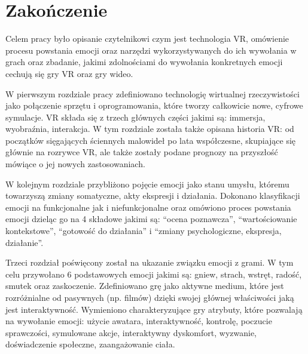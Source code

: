 \chapter*{Zakończenie}
\label{chap:zakonczenie}


Celem pracy było opisanie czytelnikowi czym jest technologia VR,
omówienie procesu powstania emocji oraz narzędzi wykorzystywanych do ich wywołania w
grach oraz zbadanie, jakimi zdolnościami do wywołania konkretnych emocji cechują się gry VR oraz gry wideo.
    
W pierwszym rozdziale pracy zdefiniowano technologię wirtualnej rzeczywistości jako połączenie sprzętu i oprogramowania, które tworzy całkowicie nowe, cyfrowe symulacje. VR składa się z trzech głównych części jakimi są:  immersja, wyobraźnia, interakcja. W tym rozdziale została także opisana historia VR: od początków sięgających ściennych malowideł po lata współczesne, skupiające się głównie na rozrywce VR, ale także zostały podane prognozy na przyszłość mówiące o jej nowych zastosowaniach.

W kolejnym rozdziale przybliżono pojęcie emocji jako stanu umysłu, któremu towarzyszą zmiany somatyczne, akty ekspresji i działania. Dokonano  klasyfikacji emocji na funkcjonalne jak i niefunkcjonalne oraz omówiono proces powstania emocji dzieląc go na 4 składowe jakimi są: 
``ocena poznawcza'', ``wartościowanie kontekstowe'', ``gotowość do działania'' i ``zmiany psychologiczne, ekspresja, działanie''.

Trzeci rozdział poświęcony został na ukazanie związku emocji z grami. W tym celu przywołano 6 podstawowych emocji jakimi są: gniew, strach, wstręt, radość, smutek oraz zaskoczenie. Zdefiniowano grę jako aktywne medium, które jest rozróżnialne od pasywnych (np. filmów) dzięki swojej głównej właściwości jaką jest interaktywność. Wymieniono charakteryzujące gry atrybuty, które pozwalają na wywołanie emocji: użycie awatara, interaktywność, kontrolę, poczucie sprawczości, symulowane akcje, interaktywny dyskomfort, wyzwanie, doświadczenie społeczne, zaangażowanie ciała.

